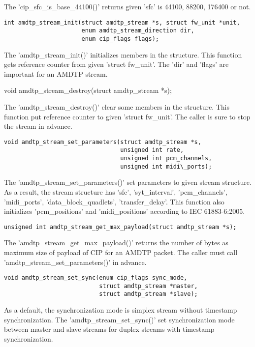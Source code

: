 \documentclass[onecolumn]{article}
\begin{document}
The 'cip\_sfc\_is\_base\_44100()' returns given 'sfc' is 44100, 88200, 176400 or not.

\begin{verbatim}
int amdtp_stream_init(struct amdtp_stream *s, struct fw_unit *unit,
                      enum amdtp_stream_direction dir,
                      enum cip_flags flags);
\end{verbatim}

The 'amdtp\_stream\_init()' initializes members in the structure. This function gets reference counter from given 'struct fw\_unit'. The 'dir' and 'flags' are important for an AMDTP stream.

void amdtp\_stream\_destroy(struct amdtp\_stream *s);

The 'amdtp\_stream\_destroy()' clear some members in the structure. This function put reference counter to given 'struct fw\_unit'. The caller is sure to stop the stream in advance.

\begin{verbatim}
void amdtp_stream_set_parameters(struct amdtp_stream *s,
                                 unsigned int rate,
                                 unsigned int pcm_channels,
                                 unsigned int midi\_ports);
\end{verbatim}

The 'amdtp\_stream\_set\_parameters()' set parameters to given stream structure. As a result, the stream structure has 'sfc', 'syt\_interval', 'pcm\_channels', 'midi\_ports', 'data\_block\_quadlets', 'transfer\_delay'. This function also initializes 'pcm\_positions' and 'midi\_positions' according to IEC 61883-6:2005.

\begin{verbatim}
unsigned int amdtp_stream_get_max_payload(struct amdtp_stream *s);
\end{verbatim}

The 'amdtp\_stream\_get\_max\_payload()' returns the number of bytes as maximum size of payload of CIP for an AMDTP packet. The caller must call 'amdtp\_stream\_set\_parameters()' in advance.

\begin{verbatim}
void amdtp_stream_set_sync(enum cip_flags sync_mode,
                           struct amdtp_stream *master,
                           struct amdtp_stream *slave);
\end{verbatim}

As a default, the synchronization mode is simplex stream without timestamp synchronization. The 'amdtp\_stream\_set\_sync()' set synchronization mode between master and slave streams for duplex streams with timestamp synchronization.
\end{document}
